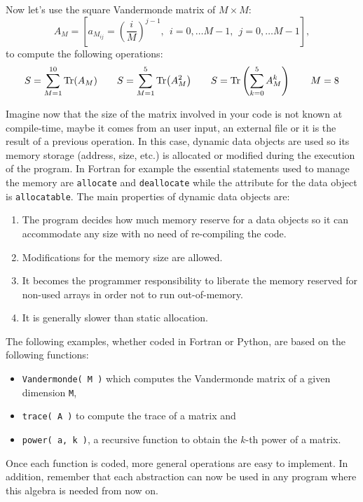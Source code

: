Now let's use the square Vandermonde matrix  of $M\times M$:
$$
A_M =  \left[ a_{ M_{ij} } = \left( \frac{i}{M} \right)^{j-1}, \ \ i = 0, \ldots M-1, \ \  j=0, \ldots M-1 \right],  
$$
to compute the following operations:
$$ 
S = \sum_{M=1} ^{10} \Tr(A_M)  \qquad
S = \sum_{M=1} ^{5} \Tr(A_M^2) \qquad
S = \Tr \left( \sum_{k=0} ^{5} A_M^k  \right)  \qquad  M=8 
$$

Imagine now that the size of the matrix involved in your code is not known at compile-time, maybe it comes from 
an user input, 
an external file or 
it is the result of a previous operation. 
In this case, dynamic data objects are used so its memory storage (address, size, etc.) is allocated or modified during the execution of the program.
In Fortran for example the essential statements used to manage the memory are 
\texttt{allocate} and \texttt{deallocate} while the attribute for the data object is \texttt{allocatable}. 
The main properties of dynamic data objects are:

\begin{enumerate}
    \item The program decides how much memory reserve for a data objects so it can accommodate any size with no need of re-compiling the code.
    \item Modifications for the memory size are allowed. 
    \item It becomes the programmer responsibility to liberate the memory reserved for non-used arrays in order not to run out-of-memory.
    \item It is generally slower than static allocation. 
\end{enumerate}

The following examples, whether coded in Fortran or Python, are based on the following functions: 
\begin{itemize}[noitemsep]
    \item \texttt{Vandermonde( M )} which computes the Vandermonde matrix of a given dimension \texttt{M},
    \item \texttt{trace( A )} to compute the trace of a matrix and
    \item \texttt{power( a, k )}, a recursive function to obtain the $k$-th power of a matrix.
\end{itemize}
Once each function is coded, more general operations are easy to implement. 
In addition, remember that each abstraction can now be used in any program where this algebra is needed from now on. 




